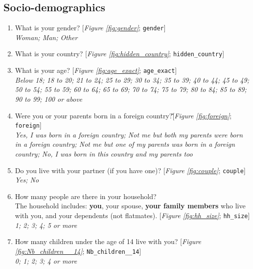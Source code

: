  \subsection*{Socio-demographics} 
 \begin{enumerate}[resume] 
\item  \label{q:gender} What is your gender? [\textit{Figure \ref{fig:gender}}; 
\verb|gender|]
  \\ \textit{Woman; Man; Other}

\item  \label{q:hidden_country} What is your country? [\textit{Figure \ref{fig:hidden_country}}; 
\verb|hidden_country|]


\item  \label{q:age_exact} What is your age? [\textit{Figure \ref{fig:age_exact}}; 
\verb|age_exact|]
  \\ \textit{Below 18; 18 to 20; 21 to 24; 25 to 29; 30 to 34; 35 to 39; 40 to 44; 45 to 49; 50 to 54; 55 to 59; 60 to 64; 65 to 69; 70 to 74; 75 to 79; 80 to 84; 85 to 89; 90 to 99; 100 or above}

\item  \label{q:foreign} Were you or your parents born in a foreign country?\~ [\textit{Figure \ref{fig:foreign}}; 
\verb|foreign|]
  \\ \textit{Yes, I was born in a foreign country; Not me but both my parents were born in a foreign country; Not me but one of my parents was born in a foreign country; No, I was born in this country and my parents too}

\item  \label{q:couple} Do you live with your partner (if you have one)? [\textit{Figure \ref{fig:couple}}; 
\verb|couple|]
  \\ \textit{Yes; No}

\item  \label{q:hh_size} How many people are there in your household? \\The household includes: \textbf{you}, your spouse, \textbf{your family members} who live with you, and your dependents (not flatmates). [\textit{Figure \ref{fig:hh_size}}; 
\verb|hh_size|]
  \\ \textit{1; 2; 3; 4; 5 or more}

\item  \label{q:Nb_children__14} How many children under the age of 14 live with you? [\textit{Figure \ref{fig:Nb_children__14}}; 
\verb|Nb_children__14|]
  \\ \textit{0; 1; 2; 3; 4 or more}


\end{enumerate}
